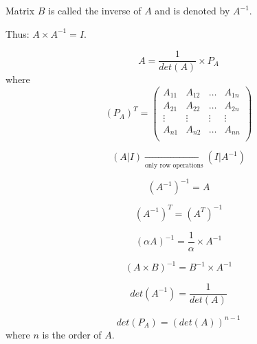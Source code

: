     \par Matrix $B$ is called the inverse of $A$ and is denoted by $A^{-1}$.
    \par Thus: $A \times A^{-1} = I$.

      \[
        A = \frac{1}{det(A)} \times P_{A}
      \]
      where
      \[
        (P_{A})^{T} =
        \begin{pmatrix}
          A_{11} & A_{12} & \ldots & A_{1n} \\
          A_{21} & A_{22} & \ldots & A_{2n} \\
          \vdots & \vdots & \vdots & \vdots \\
          A_{n1} & A_{n2} & \ldots & A_{nn} \\
        \end{pmatrix}
      \]

    \[
      (A|I) \xrightarrow[\text{only row operations}]{} (I|A^{-1})
    \]

      \[
        (A^{-1})^{-1} = A
      \]

      \[
        (A^{-1})^{T} = (A^{T})^{-1}
      \]

      \[
        (\alpha A)^{-1} = \frac{1}{\alpha} \times A^{-1}
      \]

      \[
        (A \times B)^{-1} = B^{-1} \times A^{-1}
      \]

      \[
        det(A^{-1}) = \frac{1}{det(A)}
      \]

      \[
        det(P_{A}) = (det(A))^{n - 1}
      \]
      where $n$ is the order of $A$.
